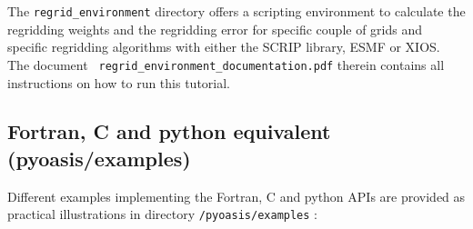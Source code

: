 The {\tt regrid\_environment} directory offers a scripting environment to
calculate the regridding weights and the regridding error for specific
couple of grids and specific regridding algorithms with either the
SCRIP library, ESMF or XIOS. The document {\tt
  regrid\_environment\_documentation.pdf} therein contains all
instructions on how to run this tutorial.

\subsection{Fortran, C and python equivalent (pyoasis/examples)}
\label{subsec_equivalent}

Different examples implementing the Fortran, C and python APIs are provided as practical illustrations in directory {\tt /pyoasis/examples} :

